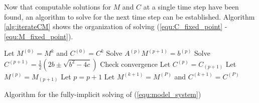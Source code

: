 

Now that computable solutions for $M$ and $C$ at a single time step have been found, an algorithm to solve for the next time step can be established.
Algorithm \ref{alg:iterateCM} shows the organization of solving (\ref{equ:C_fixed_point} - \ref{equ:M_fixed_point}). 
\begin{algorithm}
  \Begin
  {
    Let $M^{(0)} = M^{k}$ and $C^{(0)} = C^{k}$\;
    {
        Solve $A^{(p)} M^{(p+1)} = b^{(p)}$\;
        Solve $C^{(p+1)} = \frac{1}{2} \left( 2b \pm \sqrt{b^2 - 4c} \right)$\;
        Check convergence\; 
        Let $C^{(p)} = C_{(p+1)}$\;
        Let $M^{(p)} = M_{(p+1)}$\;
        Let $p = p + 1 $\;
    }
    Let $M^{(k+1)} = M^{(P)}$ and $C^{(k+1)} = C^{(P)}$\;
  }
  \caption{Algorithm for the fully-implicit solving of (\ref{equ:model_system}) }
  \label{alg:iterateCM}
\end{algorithm}

